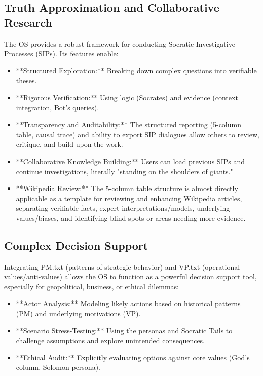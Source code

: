 \documentclass[11pt,a4paper]{article}
\theoremstyle{definition}
\theoremstyle{remark}
\begin{document}
\begin{itemize}
\subsection{Truth Approximation and Collaborative Research}
The OS provides a robust framework for conducting Socratic Investigative Processes (SIPs). Its features enable:
\begin{itemize}
    \item **Structured Exploration:** Breaking down complex questions into verifiable theses.
    \item **Rigorous Verification:** Using logic (Socrates) and evidence (context integration, Bot's queries).
    \item **Transparency and Auditability:** The structured reporting (5-column table, causal trace) and ability to export SIP dialogues allow others to review, critique, and build upon the work.
    \item **Collaborative Knowledge Building:** Users can load previous SIPs and continue investigations, literally "standing on the shoulders of giants."
    \item **Wikipedia Review:** The 5-column table structure is almost directly applicable as a template for reviewing and enhancing Wikipedia articles, separating verifiable facts, expert interpretations/models, underlying values/biases, and identifying blind spots or areas needing more evidence.
\end{itemize}

\subsection{Complex Decision Support}
Integrating PM.txt (patterns of strategic behavior) and VP.txt (operational values/anti-values) allows the OS to function as a powerful decision support tool, especially for geopolitical, business, or ethical dilemmas:
\begin{itemize}
    \item **Actor Analysis:** Modeling likely actions based on historical patterns (PM) and underlying motivations (VP).
    \item **Scenario Stress-Testing:** Using the personas and Socratic Tails to challenge assumptions and explore unintended consequences.
    \item **Ethical Audit:** Explicitly evaluating options against core values (God's column, Solomon persona).
\end{itemize}


\end{itemize}
\end{document}
